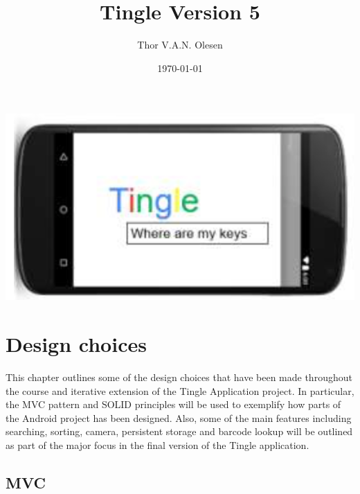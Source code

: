 \documentclass{article} %
\title{Tingle Version 5}
\date{\today}
\author{Thor V.A.N. Olesen}
\begin{document}
\maketitle


\begin{center}
\includegraphics[width=\textwidth]{images/FrontPage}
\end{center}

\newpage

\tableofcontents

\newpage


\section{Design choices}


This chapter outlines some of the design choices that have been made throughout the course and iterative extension of the Tingle Application project. In particular, the MVC pattern and SOLID principles will be used to exemplify how parts of the Android project has been designed. Also, some of the main features including searching, sorting, camera, persistent storage and barcode lookup will be outlined as part of the major focus in the final version of the Tingle application. 

\subsection{MVC}

\end{document}
